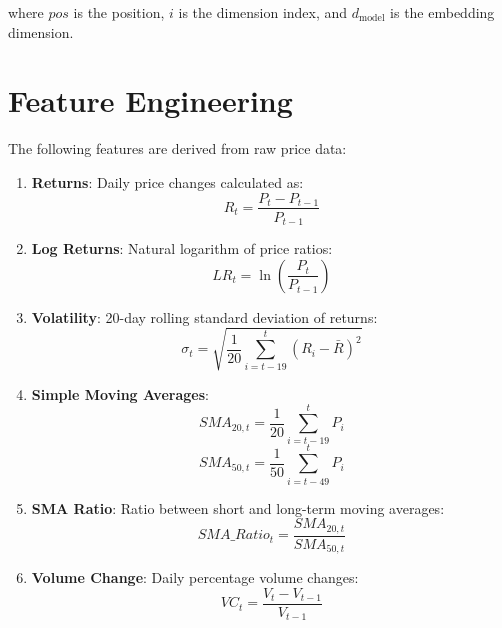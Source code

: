 \documentclass[conference]{IEEEtran}
\begin{document}
where $pos$ is the position, $i$ is the dimension index, and $d_{\text{model}}$ is the embedding dimension.

\section{Feature Engineering}

The following features are derived from raw price data:

\begin{enumerate}
\item \textbf{Returns}: Daily price changes calculated as:
   \begin{equation}
   R_t = \frac{P_t - P_{t-1}}{P_{t-1}}
   \end{equation}

\item \textbf{Log Returns}: Natural logarithm of price ratios:
   \begin{equation}
   LR_t = \ln\left(\frac{P_t}{P_{t-1}}\right)
   \end{equation}

\item \textbf{Volatility}: 20-day rolling standard deviation of returns:
   \begin{equation}
   \sigma_t = \sqrt{\frac{1}{20} \sum_{i=t-19}^{t} (R_i - \bar{R})^2}
   \end{equation}

\item \textbf{Simple Moving Averages}:
   \begin{equation}
   SMA_{20,t} = \frac{1}{20} \sum_{i=t-19}^{t} P_i
   \end{equation}
   \begin{equation}
   SMA_{50,t} = \frac{1}{50} \sum_{i=t-49}^{t} P_i
   \end{equation}

\item \textbf{SMA Ratio}: Ratio between short and long-term moving averages:
   \begin{equation}
   SMA\_Ratio_t = \frac{SMA_{20,t}}{SMA_{50,t}}
   \end{equation}

\item \textbf{Volume Change}: Daily percentage volume changes:
   \begin{equation}
   VC_t = \frac{V_t - V_{t-1}}{V_{t-1}}
   \end{equation}
\end{enumerate}
\end{document}
